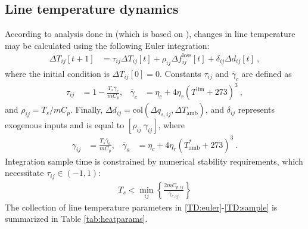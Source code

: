 \documentclass[conference]{IEEEtran}
\begin{document}
\subsection{Line temperature dynamics}\label{sec:temp-dynamics}
According to analysis done in \cite{almassalkhi2014} (which is based on \cite{ieee2007}), changes in line temperature may be calculated using the following Euler integration:
\begin{align}
\label{TD:euler}
\Delta T_{ij}[t+1] &= \tau_{ij}\Delta T_{ij}[t] + \rho_{ij}\Delta f_{ij}^\text{loss}[t] + \delta_{ij}\Delta d_{ij}[t]~,
\end{align}
where the initial condition is $\Delta T_{ij}[0] = 0$. Constants $\tau_{ij}$ and $\bar{\gamma}_c$ are defined as
\begin{align}
\tau_{ij} &= 1 - \frac{T_s\bar{\gamma}_c}{mC_p},& \bar{\gamma}_c &= \eta_c + 4\eta_r(T^\text{lim} + 273)^3~,
\end{align}
and $\rho_{ij} = T_s/mC_p$. Finally, $\Delta d_{ij} = \text{col}(\Delta q_{s,ij},\Delta T_\text{amb})$, and $\delta_{ij}$ represents exogenous inputs and is equal to $[\rho_{ij}~\gamma_{ij}]$, where
\begin{align}
\gamma_{ij} &= \frac{T_s\bar{\gamma}_a}{mC_p}, & \bar{\gamma}_a &= \eta_c + 4\eta_r(T_\text{amb}^* + 273)^3~.
\end{align}
Integration sample time is constrained by numerical stability requirements, which necessitate $\tau_{ij}\in(-1,1)$:
\begin{align}
\label{TD:sample}
T_s < \min_{ij}\left\lbrace \frac{2mC_{p,ij}}{\bar{\gamma}_{c,ij}}\right\rbrace
\end{align}
The collection of line temperature parameters in \eqref{TD:euler}-\eqref{TD:sample} is summarized in Table \ref{tab:heatparams}.
\end{document}
